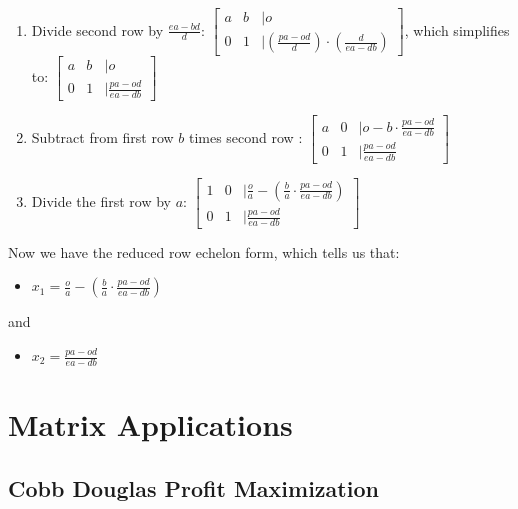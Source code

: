 \documentclass[
]{book}
\providecommand{\tightlist}{%
  \setlength{\itemsep}{0pt}\setlength{\parskip}{0pt}}
\begin{document}
\begin{enumerate}
\def\labelenumi{\arabic{enumi}.}
\item
  Divide second row by \(\frac{ea-bd}{d}\):
  \(\left\lbrack \begin{array}{ccl} a & b & |o\\ 0 & 1 & |\left(\frac{pa-od}{d}\right)\cdot \left(\frac{d}{ea-db}\right) \end{array}\right\rbrack\), which simplifies to:
  \(\left\lbrack \begin{array}{ccl} a & b & |o\\ 0 & 1 & |\frac{pa-od}{ea-db} \end{array}\right\rbrack\)
\item
  Subtract from first row \(b\) times second row :
  \(\left\lbrack \begin{array}{ccl} a & 0 & |o-b\cdot \frac{pa-od}{ea-db}\\ 0 & 1 & |\frac{pa-od}{ea-db} \end{array}\right\rbrack\)
\item
  Divide the first row by \(a\): \(\left\lbrack \begin{array}{ccl} 1 & 0 & |\frac{o}{a}-\left(\frac{b}{a}\cdot \frac{pa-od}{ea-db}\right)\\ 0 & 1 & |\frac{pa-od}{ea-db} \end{array}\right\rbrack\)
\end{enumerate}

Now we have the reduced row echelon form, which tells us that:

\begin{itemize}
\tightlist
\item
  \(\displaystyle x_1 =\frac{o}{a}-\left(\frac{b}{a}\cdot \frac{pa-od}{ea-db}\right)\)
\end{itemize}

and

\begin{itemize}
\tightlist
\item
  \(\displaystyle x_2 =\frac{pa-od}{ea-db}\)
\end{itemize}

\hypertarget{matrix-applications}{%
\chapter{Matrix Applications}\label{matrix-applications}}

\hypertarget{cobb-douglas-profit-maximization}{%
\section{Cobb Douglas Profit Maximization}\label{cobb-douglas-profit-maximization}}
\end{document}
